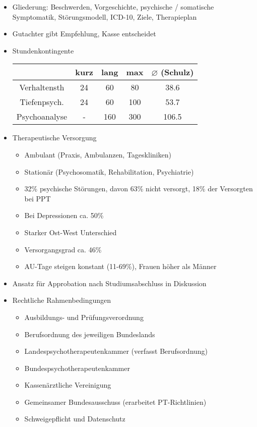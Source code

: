 \documentclass[11pt, paper=a4, twocolumn]{scrartcl}
\begin{document}
\begin{itemize}
			\item Gliederung: Beschwerden, Vorgeschichte, psychische / somatische Symptomatik, Störungsmodell, ICD-10, Ziele, Therapieplan
			\item Gutachter gibt Empfehlung, Kasse entscheidet
			\item Stundenkontingente\\
				\begin{tabular}{c|cccc}
					& kurz & lang & max & $\diameter$ (Schulz) \\
					\hline Verhaltensth & 24 & 60 & 80 & 38.6 \\
					Tiefenpsych. & 24 & 60 & 100 & 53.7 \\
					Psychoanalyse & - & 160 & 300 & 106.5
				\end{tabular}
			\item Therapeutische Versorgung
				\begin{itemize}
					\item Ambulant (Praxis, Ambulanzen, Tageskliniken)
					\item Stationär (Psychosomatik, Rehabilitation, Psychiatrie)
					\item 32\% psychische Störungen, davon 63\% nicht versorgt, 18\% der Versorgten bei PPT
					\item Bei Depressionen ca. 50\%
					\item Starker Ost-West Unterschied
					\item Versorgangsgrad ca. 46\%
					\item AU-Tage steigen konstant (11-69\%), Frauen höher als Männer
				\end{itemize}
			\item Ansatz für Approbation nach Studiumsabschluss in Diskussion
			\item Rechtliche Rahmenbedingungen
				\begin{itemize}
					\item Ausbildungs- und Prüfungsverordnung
					\item Berufsordnung des jeweiligen Bundeslands
					\item Landespsychotherapeutenkammer (verfasst Berufsordnung)
					\item Bundespsychotherapeutenkammer
					\item Kassenärztliche Vereinigung
					\item Gemeinsamer Bundesausschuss (erarbeitet PT-Richtlinien)
					\item Schweigepflicht und Datenschutz
				\end{itemize}
		\end{itemize}
\end{document}
